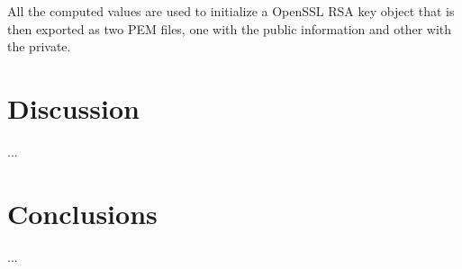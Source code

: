 \documentclass{article} %
\begin{document}
All the computed values are used to initialize a OpenSSL RSA key object that is then exported as two PEM files, one 
with the public information and other with the private.

\section{Discussion}
...

\section{Conclusions}

...
\end{document}
